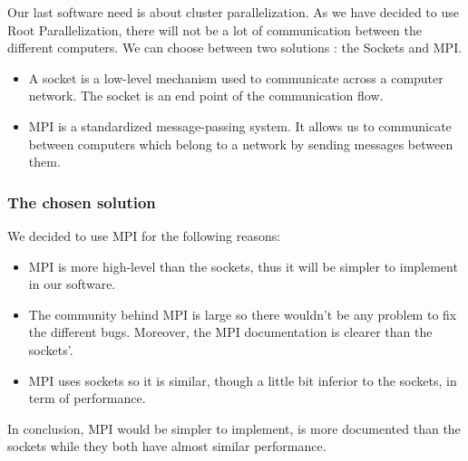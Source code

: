 Our last software need is about cluster parallelization. As we have decided to use Root Parallelization, there will not be a lot of communication between the different computers. We can choose between two solutions : the Sockets and MPI.
\begin{itemize}
\item A socket is  a low-level mechanism used to communicate across a computer network. The socket is an end point of the communication flow.
\item MPI is a standardized message-passing system. It allows us to communicate between computers which belong to a network by sending messages between them. 
\end{itemize}
\subsubsection{The chosen solution}

We decided to use MPI for the following reasons:
\begin{itemize}
\item MPI is more high-level than the sockets, thus it will be simpler to implement in our software.
\item The community behind MPI is large so there wouldn't be any problem to fix the different bugs. Moreover, the MPI documentation is clearer than the sockets'. 
\item MPI uses sockets so it is similar, though a little bit inferior to the sockets, in term of performance.
\end{itemize}
In conclusion, MPI would be simpler to implement, is more documented than the sockets while they both have almost similar performance.